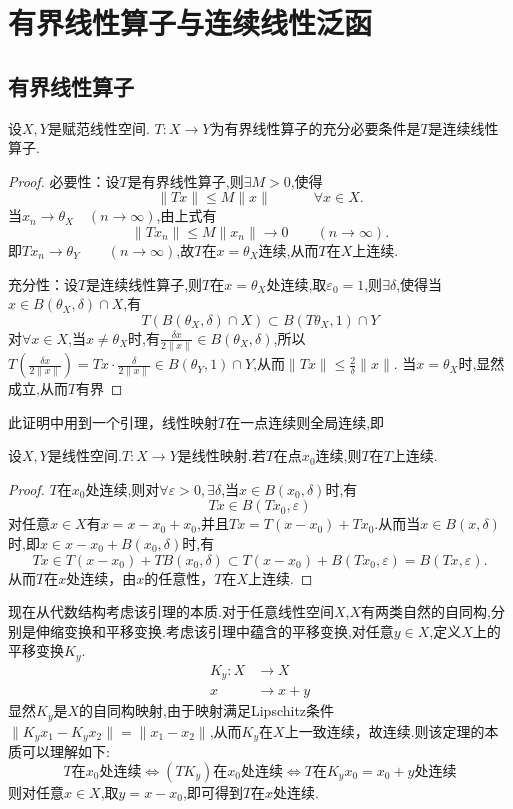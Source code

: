 \documentclass[lang=cn,18pt]{elegantbook}
\begin{document}
\chapter{有界线性算子与连续线性泛函}
\section{有界线性算子}
\begin{theorem}
    设$X,Y$是赋范线性空间.\quad
     $T: X \to Y $为有界线性算子的充分必要条件是$T$是连续线性算子.
\end{theorem}
\begin{proof}
    必要性：设$T$是有界线性算子,则$\exists M>0$,使得
    $$\|Tx\|\leqslant M\|x\| \quad\quad\quad\forall x \in X.$$
    当$x_n\to \theta_X \quad (n \to \infty)$,由上式有
    $$\|Tx_n\| \leqslant M \|x_n\|\to 0 \quad\quad (n\to \infty).$$
    即$Tx_n \to \theta_Y \quad \quad (n\to \infty)$,故$T$在$x=\theta_X$连续,从而$T$在$X$上连续.

    充分性：设$T$是连续线性算子,则$T$在$x=\theta_X$处连续,取$\varepsilon_0 =1$,则$\exists \delta$,使得当$x \in B(\theta_X,\delta)\cap X$,有
    $$T(B(\theta_X,\delta)\cap X)\subset B(T\theta_X,1)\cap Y$$
    对$\forall x \in X$,当$x \not= \theta_X$时,有$\frac{\delta x}{2\|x\|} \in B(\theta_X,\delta)$,所以$T(\frac{\delta x}{2\|x\|})=Tx\cdot \frac{\delta}{2\|x\|} \in B(\theta_Y,1)\cap Y$,从而$\|Tx\|\leqslant \frac{2}{\delta}\|x\|$.
    当$x=\theta_X$时,显然成立,从而$T$有界
    
\end{proof}
\begin{note}
    此证明中用到一个引理，线性映射$T$在一点连续则全局连续,即
    \begin{lemma}
        设$X,Y$是线性空间.$T:X\to Y$是线性映射.若$T$在点$x_0$连续,则$T$在$T$上连续.
    \end{lemma}
    \begin{proof}
        $T$在$x_0$处连续,则对$\forall \varepsilon >0,\exists \delta$,当$x \in B(x_0,\delta)$时,有
        $$Tx \in B(Tx_0,\varepsilon)$$
        对任意$x \in X$有$x=x-x_0+x_0$,并且$Tx=T(x-x_0)+Tx_0.$从而当$x \in B(x,\delta)$时,即$x \in x-x_0 +B(x_0,\delta)$时,有
        $$Tx \in T(x-x_0)+TB(x_0,\delta) \subset T(x-x_0)+B(Tx_0,\varepsilon) = B(Tx,\varepsilon).$$
        从而$T$在$x$处连续，由$x$的任意性，$T$在$X$上连续.
    \end{proof}
    现在从代数结构考虑该引理的本质.对于任意线性空间$X$,$X$有两类自然的自同构,分别是伸缩变换和平移变换.考虑该引理中蕴含的平移变换,对任意$y \in X$,定义$X$上的平移变换$K_y$.
    \begin{align*}
        K_y:X & \to X \\
            x & \to x+y
    \end{align*}
    显然$K_y$是$X$的自同构映射,由于映射满足Lipschitz条件$\|K_y x_1 -K_y x_2\|=\|x_1 -x_2\|$,从而$K_y$在$X$上一致连续，故连续.则该定理的本质可以理解如下:
    $$T\text{在}x_0\text{处连续}\Longleftrightarrow(TK_y)\text{在}x_0\text{处连续} \Longleftrightarrow T\text{在}K_y x_0=x_0 + y\text{处连续} $$
    则对任意$x \in X$,取$y=x-x_0$,即可得到$T$在$x$处连续.
\end{note}
\end{document}
